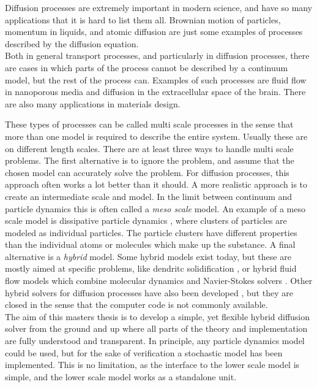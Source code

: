 Diffusion processes are extremely important in modern science, and have so many applications that it is hard to list them all. 
Brownian motion of particles, momentum in liquids, and atomic diffusion are just some examples of processes described by the diffusion equation. \\
\noindent Both in general transport processes, and particularly in diffusion processes, there are cases in which parts of the process cannot be described by a continuum model, but the rest of the process can. 
Examples of such processes are fluid flow in nanoporous media and diffusion in the extracellular space of the brain. There are also many applications in materials design.

\noindent These types of processes can be called multi scale processes in the sense that more than one model is required to describe the entire system. Usually these are on different length scales. 
There are at least three ways to handle multi scale problems. 
The first alternative is to ignore the problem, and assume that the chosen model can accurately solve the problem. For diffusion processes, this approach often works a lot better than it should. 
A more realistic approach is to create an intermediate scale and model. In the limit between continuum and particle dynamics this is often called a \emph{meso scale} model. 
An example of a meso scale model is dissipative particle dynamics \cite{warren1998dissipative}, where clusters of particles are modeled as individual particles. The particle clusters have different properties than the individual atoms or molecules which make up the substance. 
A final alternative is a \emph{hybrid} model.
Some hybrid models exist today, but these are mostly aimed at specific problems, like dendritc solidification \cite{plapp2000multiscale}, or hybrid fluid flow models which combine molecular dynamics and Navier-Stokes solvers \cite{o1995molecular}. 
Other hybrid solvers for diffusion processes have also been developed \cite{flekkoy2001coupling}, but they are closed in the sense that the computer code is not commonly available. \\

\noindent The aim of this masters thesis is to develop a simple, yet flexible hybrid diffusion solver from the ground and up where all parts of the theory and implementation are fully understood and transparent. 
In principle, any particle dynamics model could be used, but for the sake of verification a stochastic model has been implemented. 
This is no limitation, as the interface to the lower scale model is simple, and the lower scale model works as a standalone unit. \\

